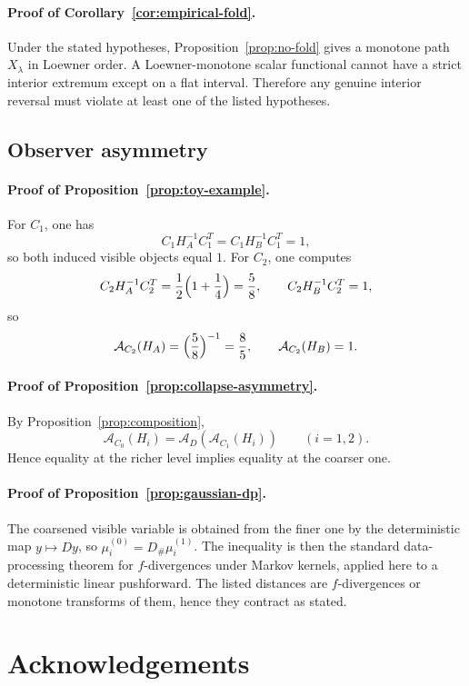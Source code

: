 \documentclass[11pt,a4paper]{article}
\numberwithin{equation}{section}
\newcommand{\Aobs}{\mathcal A}
\theoremstyle{thmcompact}
\theoremstyle{remark}
\begin{document}
\paragraph{Proof of Corollary~\ref{cor:empirical-fold}.}
Under the stated hypotheses, Proposition~\ref{prop:no-fold} gives a monotone path \(X_\lambda\) in Loewner order. A Loewner-monotone scalar functional cannot have a strict interior extremum except on a flat interval. Therefore any genuine interior reversal must violate at least one of the listed hypotheses.

\subsection{Observer asymmetry}

\paragraph{Proof of Proposition~\ref{prop:toy-example}.}
For \(C_1\), one has
\[
C_1H_A^{-1}C_1^T=C_1H_B^{-1}C_1^T=1,
\]
so both induced visible objects equal \(1\). For \(C_2\), one computes
\[
C_2H_A^{-1}C_2^T
=
\frac12\Bigl(1+\frac14\Bigr)
=
\frac58,
\qquad
C_2H_B^{-1}C_2^T=1,
\]
so
\[
\Aobs_{C_2}(H_A)=\Bigl(\frac58\Bigr)^{-1}=\frac85,
\qquad
\Aobs_{C_2}(H_B)=1.
\]

\paragraph{Proof of Proposition~\ref{prop:collapse-asymmetry}.}
By Proposition~\ref{prop:composition},
\[
\Aobs_{C_0}(H_i)=\Aobs_D(\Aobs_{C_1}(H_i))
\qquad (i=1,2).
\]
Hence equality at the richer level implies equality at the coarser one.

\paragraph{Proof of Proposition~\ref{prop:gaussian-dp}.}
The coarsened visible variable is obtained from the finer one by the deterministic map \(y\mapsto Dy\), so \(\mu_i^{(0)}=D_\#\mu_i^{(1)}\). The inequality is then the standard data-processing theorem for \(f\)-divergences under Markov kernels, applied here to a deterministic linear pushforward. The listed distances are \(f\)-divergences or monotone transforms of them, hence they contract as stated.

\section*{Acknowledgements}
\end{document}
